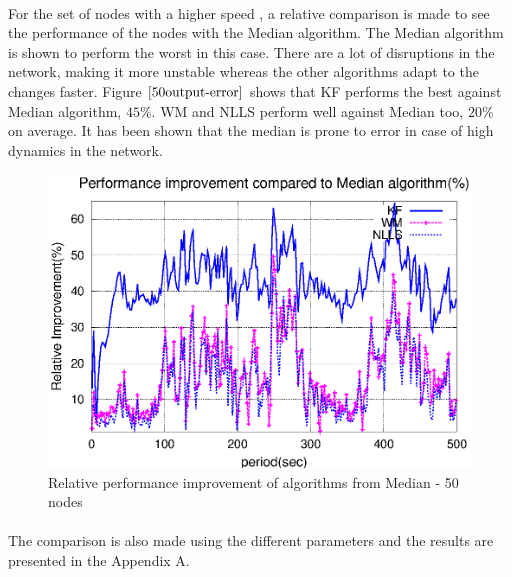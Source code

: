 \documentclass[a4paper,10pt]{report}
\begin{document}
\paragraph*{}
For the set of nodes with a higher speed , a relative comparison is made to see the performance of the nodes with the Median algorithm. The Median algorithm is shown to perform the worst in this case. There are a lot of disruptions in the network, making it more unstable whereas the other algorithms adapt to the changes faster. Figure $\ref{50output-error}$ shows that KF performs the best against Median algorithm, $45\%$. WM and NLLS perform well against Median too, $20\%$ on average. It has been shown that the median is prone to error in case of high dynamics in the network.
\begin{figure}[!h]
\centering
\includegraphics[width=0.7  \textwidth]{50output-error}
\caption{Relative performance improvement of algorithms from Median - 50 nodes} \label{50error}
\end{figure}
\paragraph*{}
The comparison is also made using the different parameters and the results are presented in the Appendix A.
\end{document}
